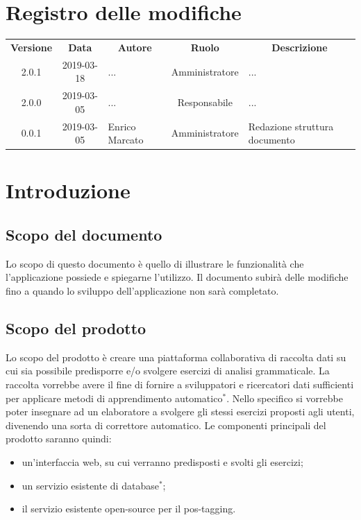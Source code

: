 \documentclass[11pt,a4paper]{article}
\begin{document}
	
	
	{\def\arraystretch{2}\tabcolsep=10pt
	\newpage
	\section*{\centering Registro delle modifiche}
	\begin{tabularx}{\textwidth}{ c | c | p{3.80cm} | c | X }
		\rowcolor{LightBlue}
		\color{white}\bfseries Versione & \color{white}\bfseries Data & \multicolumn{1}{c}{\color{white}\bfseries Autore}
		& \color{white}\bfseries Ruolo & \multicolumn{1}{c}{\color{white}\bfseries Descrizione}\\[0.25cm]
		2.0.1 & 2019-03-18 & ... & Amministratore & ... \\ \hline
		2.0.0 & 2019-03-05 & ... & Responsabile & ... \\ \hline
		0.0.1 & 2019-03-05 & Enrico Marcato & Amministratore & Redazione struttura documento \\ 
	 \hline		
	\end{tabularx}
	
	\newpage	
	
	\renewcommand  \contentsname {\Large Indice} 
	
	\tableofcontents
	\newpage
	\listoffigures
	\lstlistoflistings
	\newpage
	
	\section{Introduzione}
	\subsection{Scopo del documento}
	Lo scopo di questo documento è quello di illustrare le funzionalità che l'applicazione possiede e spiegarne l'utilizzo. Il documento subirà delle modifiche fino a quando lo sviluppo dell'applicazione non sarà completato.
	\subsection{Scopo del prodotto}
	Lo scopo del prodotto è creare una piattaforma collaborativa di raccolta dati su cui sia possibile predisporre e/o svolgere esercizi di analisi grammaticale. La raccolta vorrebbe avere il fine di fornire a sviluppatori e ricercatori dati sufficienti per applicare metodi di apprendimento automatico$^*$. Nello specifico si vorrebbe poter insegnare ad un elaboratore a svolgere gli stessi esercizi proposti agli utenti, divenendo una sorta di correttore automatico.  
	Le componenti principali del prodotto saranno quindi:
	\begin{itemize}
		\item un'interfaccia web, su cui verranno predisposti e svolti gli esercizi;
		\item un servizio esistente di database$^*$;
		\item il servizio esistente open-source per il pos-tagging.
	\end{itemize}
	
}
\end{document}

